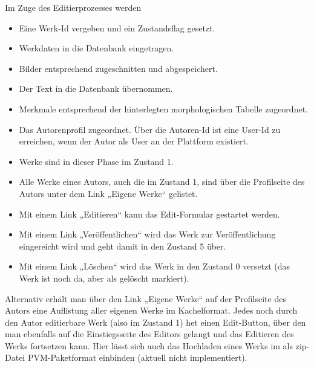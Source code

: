 \documentclass[a4paper,11pt]{article}
\begin{document}
Im Zuge des Editierprozesses werden
\begin{itemize}\itemsep0pt
\item Eine Werk-Id vergeben und ein Zustandsflag gesetzt.
\item Werkdaten in die Datenbank eingetragen.
\item Bilder entsprechend zugeschnitten und abgespeichert.
\item Der Text in die Datenbank übernommen.
\item Merkmale entsprechend der hinterlegten morphologischen Tabelle zugeordnet.
\item Das Autorenprofil zugeordnet. Über die Autoren-Id ist eine User-Id zu
  erreichen, wenn der Autor als User an der Plattform existiert.  
\item Werke sind in dieser Phase im Zustand 1.
\item Alle Werke eines Autors, auch die im Zustand 1, sind über die
  Profilseite des Autors unter dem Link „Eigene Werke“ gelistet.
\item Mit einem Link „Editieren“ kann das Edit-Formular gestartet werden.
\item Mit einem Link „Veröffentlichen“ wird  das Werk zur Veröffentlichung
  eingereicht wird und geht damit in den Zustand 5 über. 
\item Mit einem Link „Löschen“ wird das Werk in den Zustand 0 versetzt (das
  Werk ist noch da, aber als gelöscht markiert). 
\end{itemize}
Alternativ erhält man über den Link „Eigene Werke“ auf der Profilseite des
Autors eine Auflistung aller eigenen Werke im Kachelformat. Jedes noch durch
den Autor editierbare Werk (also im Zustand 1) het einen Edit-Button, über den
man ebenfalls auf die Einstiegsseite des Editors gelangt und das Editieren des
Werks fortsetzen kann.  Hier lässt sich auch das Hochladen eines Werks im
als zip-Datei PVM-Paketformat einbinden (aktuell nicht implementiert). 
\end{document}
